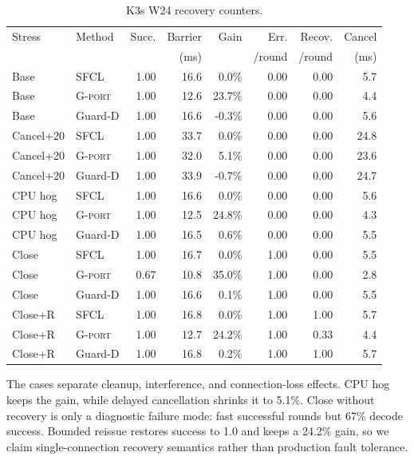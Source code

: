 \begin{table}[t]
  \centering
  \setlength{\tabcolsep}{1.0pt}
  \caption{K3s W24 recovery counters.}
  \label{tab:k8s-stress}
  \begin{tabular}{@{}llrrrrrr@{}}
    \toprule
    Stress & Method & Succ. & Barrier & Gain & Err. & Recov. & Cancel \\
         &        &       & (ms) &      & /round & /round & (ms) \\
    \midrule
    Base & SFCL & 1.00 & 16.6 & 0.0\% & 0.00 & 0.00 & 5.7 \\
    Base & \textsc{G-port} & 1.00 & 12.6 & 23.7\% & 0.00 & 0.00 & 4.4 \\
    Base & Guard-D & 1.00 & 16.6 & -0.3\% & 0.00 & 0.00 & 5.6 \\
    \midrule
    Cancel+20 & SFCL & 1.00 & 33.7 & 0.0\% & 0.00 & 0.00 & 24.8 \\
    Cancel+20 & \textsc{G-port} & 1.00 & 32.0 & 5.1\% & 0.00 & 0.00 & 23.6 \\
    Cancel+20 & Guard-D & 1.00 & 33.9 & -0.7\% & 0.00 & 0.00 & 24.7 \\
    \midrule
    CPU hog & SFCL & 1.00 & 16.6 & 0.0\% & 0.00 & 0.00 & 5.6 \\
    CPU hog & \textsc{G-port} & 1.00 & 12.5 & 24.8\% & 0.00 & 0.00 & 4.3 \\
    CPU hog & Guard-D & 1.00 & 16.5 & 0.6\% & 0.00 & 0.00 & 5.5 \\
    \midrule
    Close & SFCL & 1.00 & 16.7 & 0.0\% & 1.00 & 0.00 & 5.5 \\
    Close & \textsc{G-port} & 0.67 & 10.8 & 35.0\% & 1.00 & 0.00 & 2.8 \\
    Close & Guard-D & 1.00 & 16.6 & 0.1\% & 1.00 & 0.00 & 5.5 \\
    \midrule
    Close+R & SFCL & 1.00 & 16.8 & 0.0\% & 1.00 & 1.00 & 5.7 \\
    Close+R & \textsc{G-port} & 1.00 & 12.7 & 24.2\% & 1.00 & 0.33 & 4.4 \\
    Close+R & Guard-D & 1.00 & 16.8 & 0.2\% & 1.00 & 1.00 & 5.7 \\
    \bottomrule
  \end{tabular}
\end{table}

The cases separate cleanup, interference, and connection-loss effects.  CPU hog
keeps the gain, while delayed cancellation shrinks it to 5.1\%.  Close without
recovery is only a diagnostic failure mode: fast successful rounds but 67\%
decode success.  Bounded reissue restores success to 1.0 and keeps a 24.2\%
gain, so we claim single-connection recovery semantics rather than production
fault tolerance.

